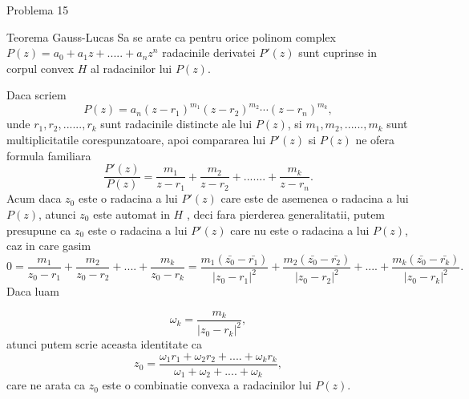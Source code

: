 \documentclass[a4paper,12pt,oneside]{report}
\begin{document}
Problema 15 

Teorema Gauss-Lucas
Sa se arate ca pentru orice polinom complex \(P\left ( z \right ) = a_{0} + a_{1}z + ..... +a_{n}z^{n}\) radacinile derivatei \({P}'\left ( z \right )\) sunt cuprinse in corpul convex \(H\) al radacinilor lui \(P\left ( z \right )\). 

Daca scriem 
\begin{displaymath}
  P\left ( z \right ) = a_{n}\left ( z - r_{1} \right )^{m_{1}}\left ( z - r_{2} \right )^{m_{2}}\cdots \left ( z - r_{n} \right )^{m_{k}},
\end{displaymath}
unde  \(r_{1} , r_{2}, ......, r_{k}\) sunt radacinile distincte ale lui \(P\left ( z \right )\), si \(m_{1} , m_{2}, ......, m_{k}\) sunt multiplicitatile corespunzatoare, apoi compararea lui \({P}'\left ( z \right )\) si \( P\left ( z \right )\) ne ofera formula familiara
\begin{displaymath}
  \frac{{P}'\left ( z \right ) }{P\left ( z \right )} = \frac{m_{1}}{z - r_{1}} + \frac{m_{2}}{z - r_{2}}+ .......+ \frac{m_{k}}{z - r_{n}} . 
\end{displaymath}
Acum daca \(z_{0}\) este o radacina a lui \({P}'\left ( z \right )\) care este de asemenea o radacina a lui \(P\left ( z \right )\), atunci \(z_{0}\) este automat in \(H\) , deci fara pierderea generalitatii, putem presupune ca \(z_{0}\)  este o radacina a lui  \({P}'\left ( z \right )\) care nu este o radacina a lui \(P\left ( z \right )\), caz in care gasim 
\begin{displaymath}
  0 = \frac{m_{1}}{z_{0} - r_{1}} + \frac{m_{2}}{z_{0} - r_{2}} +....+ \frac{m_{k}}{z_{0} - r_{k}} = \frac{m_{1}\left (\bar{z_{0}} - \bar{r_{1}}\right )}{\left | z_{0}  - r_{1}\right |^{2}} + \frac{m_{2}\left (\bar{z_{0}} - \bar{r_{2}}\right )}{\left | z_{0}  - r_{2}\right |^{2}} + ....+ \frac{m_{k}\left (\bar{z_{0}} - \bar{r_{k}}\right )}{\left | z_{0}  - r_{k}\right |^{2}}. 
\end{displaymath}
Daca luam 

\begin{displaymath}
  \omega _{k} =\frac{ m_{k}}{\left | z_{0}  - r_{k}\right |^{2}},
\end{displaymath} atunci putem scrie aceasta identitate ca 
\begin{displaymath}
  z_{0} = \frac{\omega _{1}r_{1} +\omega _{2}r{_2}+....+ \omega _{k}r{_k} }{\omega _{1} + \omega _{2} + .... + \omega _{k}}, 
\end{displaymath}
care ne arata ca \(z_{0}\) este o combinatie convexa a radacinilor lui \(P\left ( z \right )\). 
\end{document}
